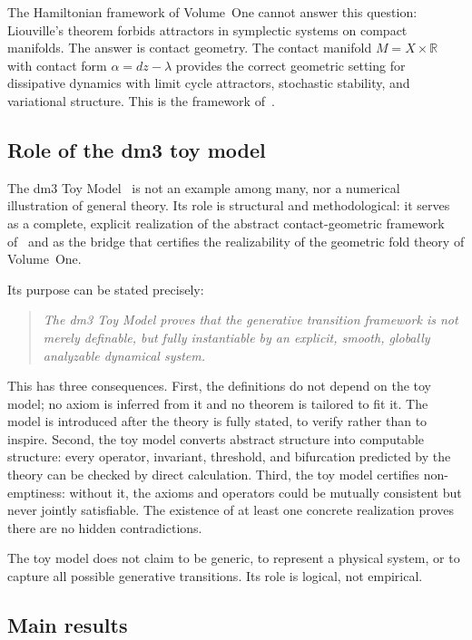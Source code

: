 \documentclass[12pt, oneside]{book}
\theoremstyle{plain}
\theoremstyle{definition}
\theoremstyle{remark}
\newcommand{\R}{\mathbb{R}}
\begin{document}
The Hamiltonian framework of Volume~One cannot answer this question:
Liouville's theorem forbids attractors in symplectic systems on
compact manifolds. The answer is contact geometry. The contact
manifold $M = X\times\R$ with contact form $\alpha = dz - \lambda$
provides the correct geometric setting for dissipative dynamics
with limit cycle attractors, stochastic stability, and variational
structure. This is the framework of~\cite{Paper1}.

\subsection{Role of the dm3 toy model}
\label{subsec:toymodel-role}

The dm3 Toy Model~\cite{Paper2} is not an example among many,
nor a numerical illustration of general theory. Its role is
structural and methodological: it serves as a complete, explicit
realization of the abstract contact-geometric framework of~\cite{Paper1}
and as the bridge that certifies the realizability of the geometric
fold theory of Volume~One.

Its purpose can be stated precisely:

\begin{quote}
\emph{The dm3 Toy Model proves that the generative transition
framework is not merely definable, but fully instantiable by an
explicit, smooth, globally analyzable dynamical system.}
\end{quote}

This has three consequences. First, the definitions do not depend
on the toy model; no axiom is inferred from it and no theorem is
tailored to fit it. The model is introduced after the theory is
fully stated, to verify rather than to inspire. Second, the toy
model converts abstract structure into computable structure: every
operator, invariant, threshold, and bifurcation predicted by the
theory can be checked by direct calculation. Third, the toy model
certifies non-emptiness: without it, the axioms and operators could
be mutually consistent but never jointly satisfiable. The existence
of at least one concrete realization proves there are no hidden
contradictions.

The toy model does not claim to be generic, to represent a physical
system, or to capture all possible generative transitions. Its role
is logical, not empirical.

\subsection{Main results}
\end{document}

